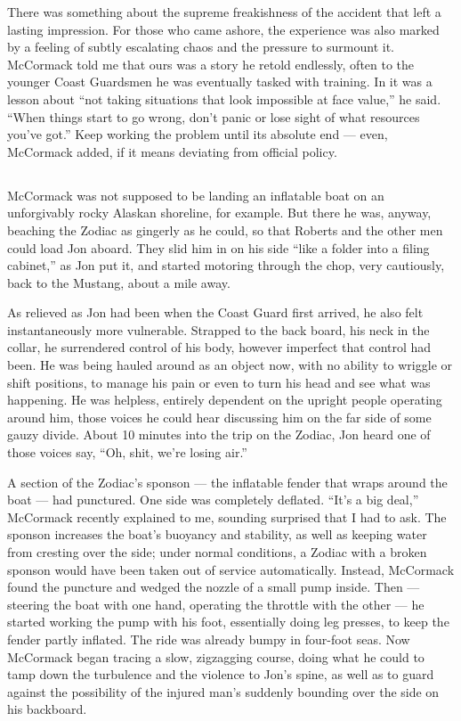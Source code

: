 There was something about the supreme freakishness of the accident that
left a lasting impression. For those who came ashore, the experience was
also marked by a feeling of subtly escalating chaos and the pressure to
surmount it. McCormack told me that ours was a story he retold
endlessly, often to the younger Coast Guardsmen he was eventually tasked
with training. In it was a lesson about ``not taking situations that
look impossible at face value,'' he said. ``When things start to go
wrong, don't panic or lose sight of what resources you've got.'' Keep
working the problem until its absolute end --- even, McCormack added, if
it means deviating from official policy.

\hypertarget{-2}{%
\subsection{}\label{-2}}

McCormack was not supposed to be landing an inflatable boat on an
unforgivably rocky Alaskan shoreline, for example. But there he was,
anyway, beaching the Zodiac as gingerly as he could, so that Roberts and
the other men could load Jon aboard. They slid him in on his side ``like
a folder into a filing cabinet,'' as Jon put it, and started motoring
through the chop, very cautiously, back to the Mustang, about a mile
away.

As relieved as Jon had been when the Coast Guard first arrived, he also
felt instantaneously more vulnerable. Strapped to the back board, his
neck in the collar, he surrendered control of his body, however
imperfect that control had been. He was being hauled around as an object
now, with no ability to wriggle or shift positions, to manage his pain
or even to turn his head and see what was happening. He was helpless,
entirely dependent on the upright people operating around him, those
voices he could hear discussing him on the far side of some gauzy
divide. About 10 minutes into the trip on the Zodiac, Jon heard one of
those voices say, ``Oh, shit, we're losing air.''

A section of the Zodiac's sponson --- the inflatable fender that wraps
around the boat --- had punctured. One side was completely deflated.
``It's a big deal,'' McCormack recently explained to me, sounding
surprised that I had to ask. The sponson increases the boat's buoyancy
and stability, as well as keeping water from cresting over the side;
under normal conditions, a Zodiac with a broken sponson would have been
taken out of service automatically. Instead, McCormack found the
puncture and wedged the nozzle of a small pump inside. Then --- steering
the boat with one hand, operating the throttle with the other --- he
started working the pump with his foot, essentially doing leg presses,
to keep the fender partly inflated. The ride was already bumpy in
four-foot seas. Now McCormack began tracing a slow, zigzagging course,
doing what he could to tamp down the turbulence and the violence to
Jon's spine, as well as to guard against the possibility of the injured
man's suddenly bounding over the side on his backboard.


